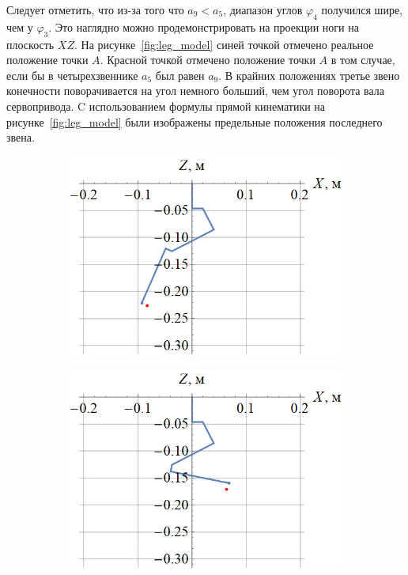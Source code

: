 Следует отметить, что из-за того что $ a_9 < a_5 $, диапазон углов $ \varphi_4 $ получился шире, чем у $ \varphi_3 $. Это наглядно можно продемонстрировать на проекции ноги на плоскость $ XZ $. На рисунке~\ref{fig:leg_model} синей точкой отмечено реальное положение точки $ A $. Красной точкой отмечено положение точки $ A $ в том случае, если бы в четырехзвеннике $ a_5 $ был равен $ a_9 $. В крайних положениях третье звено конечности поворачивается на угол немного больший, чем угол поворота вала сервопривода. C использованием формулы прямой кинематики на рисунке~\ref{fig:leg_model} были изображены предельные положения последнего звена.
\begin{figure}[ht]
    \centering
    \begin{subfigure}[b]{0.45\textwidth}    
        \centering
        \includegraphics[scale=0.4]{chapter_kinematics/figure5.png}
        \caption{}
    \end{subfigure}
    \begin{subfigure}[b]{0.45\textwidth}
        \centering
        \includegraphics[scale=0.4]{chapter_kinematics/figure6.png}
        \caption{}
    \end{subfigure}
     

\end{figure}
